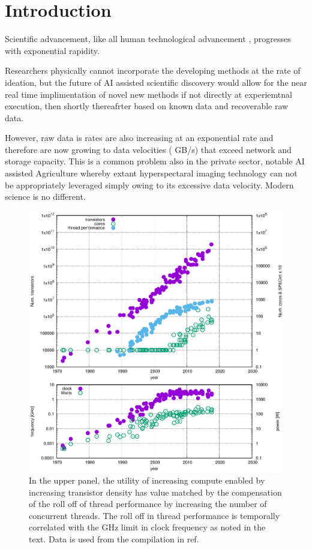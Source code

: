 \documentclass{article}
\begin{document}
\section{Introduction}
Scientific advancement, like all human technological advancement \cite{Kurzweil}, progresses with exponential rapidity.

Researchers physically cannot incorporate the developing methods at the rate of ideation, but the future of AI assisted scientific discovery would allow for the near real time implimentation of novel new methods if not directly at experiemtnal execution, then shortly thereafrter based on known data and recoverable raw data.

However, raw data is rates are also increasing at an exponential rate and therefore are now growing to data velocities ( GB/s) that exceed network and storage capacity.  This is a common problem also in the private sector, notable AI assisted Agriculture whereby extant hyperspectaral imaging technology can not be appropriately leveraged simply owing to its excessive data velocity.
Modern science is no different.

\begin{figure}
\centerline{ \includegraphics[clip,width=\linewidth]{plotting_technology.eps} }
	\caption{\label{fig::technology} In the upper panel, the utility of increasing compute enabled by increasing transistor density has value matched by the compensation of the roll off of thread performance by increasing the number of concurrent threads.
	The roll off in thread performance is temporally correlated with the GHz limit in clock frequency as noted in the text.
	Data is used from the compilation in ref.~\cite{MicroprocessorTrendData}
	}
\end{figure}
\end{document}
